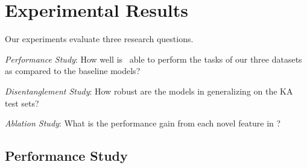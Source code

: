 \section{Experimental Results}
\label{sec:experiments}

Our experiments evaluate three research questions. 
\begin{compactenum}
    \item \emph{Performance Study}: How well is \sys\ able to perform the tasks of our three datasets as compared to the baseline models? 
    \item \emph{Disentanglement Study}: How robust are the models in generalizing on the KA test sets? 
    \item \emph{Ablation Study}: What is the performance gain from each novel feature in \sys? 
\end{compactenum}

\subsection{Performance Study}
\label{sec:expt2}

